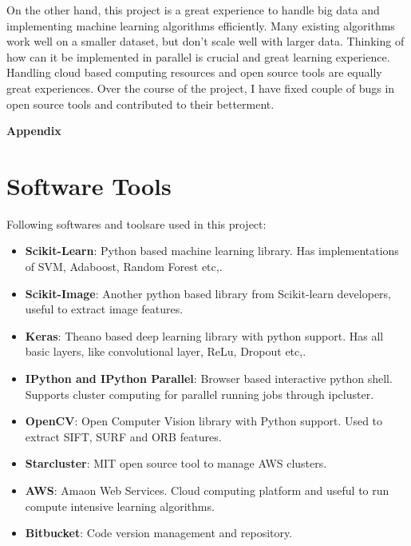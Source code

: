 \documentclass[12pt]{article}
\begin{document}
On the other hand, this project is a great experience to handle big data and implementing machine learning algorithms efficiently. Many existing algorithms work well on a smaller dataset, but don't scale well with larger data. Thinking of how can it be implemented in parallel is crucial and great learning experience. Handling cloud based computing resources and open source tools are equally great experiences. Over the course of the project, I have fixed couple of bugs in open source tools and contributed to their betterment.



%


\newpage
\begin{center}
\begin{LARGE}
\textbf{Appendix}
\end{LARGE}
\end{center}
\appendix
\section{Software Tools}
Following softwares and toolsare used in this project:
\begin{itemize}
\item \textbf{Scikit-Learn}: Python based machine learning library. Has implementations of SVM, Adaboost, Random Forest etc,.
\item \textbf{Scikit-Image}: Another python based library from Scikit-learn developers, useful to extract image features.
\item \textbf{Keras}: Theano based deep learning library with python support. Has all basic layers, like convolutional layer, ReLu, Dropout etc,.
\item \textbf{IPython and IPython Parallel}: Browser based interactive python shell. Supports cluster computing for parallel running jobs through ipcluster.
\item \textbf{OpenCV}: Open Computer Vision library with Python support. Used to extract SIFT, SURF and ORB features.
\item \textbf{Starcluster}: MIT open source tool to manage AWS clusters.
\item \textbf{AWS}: Amaon Web Services. Cloud computing platform and useful to run compute intensive learning algorithms.
\item \textbf{Bitbucket}: Code version management and repository.
\end{itemize}
\end{document}
